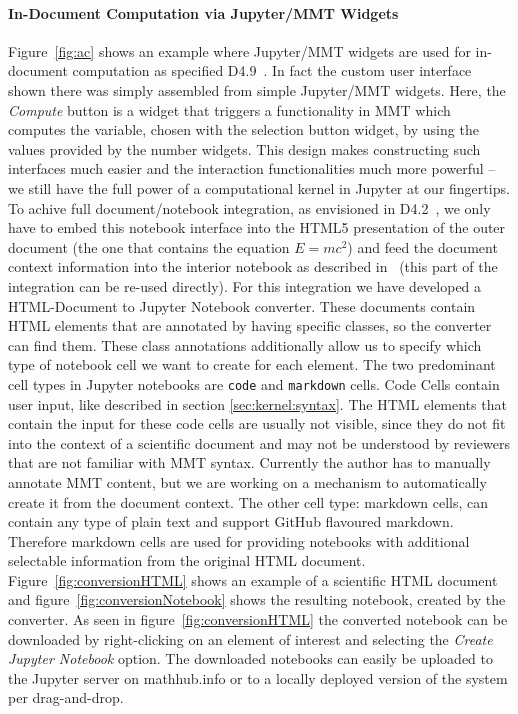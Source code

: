 
\paragraph{In-Document Computation via Jupyter/MMT Widgets}
Figure~\ref{fig:ac} shows an example where Jupyter/MMT widgets are used for in-document computation as specified D4.9~\cite{ODK-D4.9}.
In fact the custom user interface shown there was simply assembled from simple Jupyter/MMT widgets. Here, the \textit{Compute} button is a widget that triggers a functionality in MMT which computes the variable, chosen with the selection button widget, by using the values provided by the number widgets.
This design makes constructing such interfaces much easier and the interaction functionalities much more powerful -- we still have the full power of a computational kernel in Jupyter at our fingertips. 
To achive full document/notebook integration, as envisioned in D4.2~\cite{ODK-D4.2}, we only have to embed this notebook interface into the HTML5 presentation of the outer document (the one that contains the equation $E=mc^2$) and feed the document context information into the interior notebook as described in~\cite{ODK-D4.9} (this part of the integration can be re-used directly).
For this integration we have developed a HTML-Document to Jupyter Notebook converter. These documents contain HTML elements that are annotated by having specific classes, so the converter can find them. 
These class annotations additionally allow us to specify which type of notebook cell we want to create for each element. 
The two predominant cell types in Jupyter notebooks are \texttt{code} and \texttt{markdown} cells. 
Code Cells contain user input, like described in section \ref{sec:kernel:syntax}. The HTML elements that contain the input for these code cells are usually not visible, since they do not fit into the context of a scientific document and may not be understood by reviewers that are not familiar with MMT syntax. 
Currently the author has to manually annotate MMT content, but we are working on a mechanism to automatically create it from the document context. The other cell type: markdown cells, can contain any type of plain text and support GitHub flavoured markdown. 
Therefore markdown cells are used for providing notebooks with additional selectable information from the original HTML document. Figure~\ref{fig:conversionHTML} shows an example of a scientific HTML document and  figure~\ref{fig:conversionNotebook} shows the resulting notebook, created by the converter. As seen in figure~\ref{fig:conversionHTML} the converted notebook can be downloaded by right-clicking on an element of interest and selecting the \textit{Create Jupyter Notebook} option. The downloaded notebooks can easily be uploaded to the Jupyter server on mathhub.info or to a locally deployed version of the system per drag-and-drop. 

